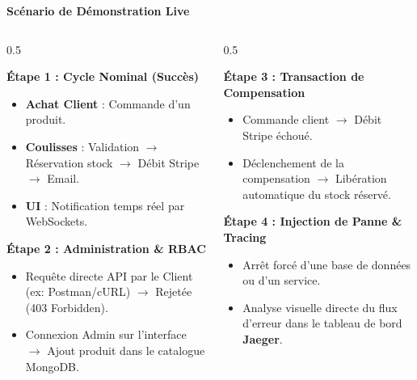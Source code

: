 \documentclass[10pt,aspectratio=169]{beamer}
\begin{document}
\begin{frame}{\textbf{Scénario de Démonstration Live}}
    \begin{columns}
        \begin{column}{0.5\textwidth}
            \begin{block}{\textbf{Étape 1 : Cycle Nominal (Succès)}}
                \begin{itemize}
                    \item \textbf{Achat Client} : Commande d'un produit.
                    \item \textbf{Coulisses} : Validation $\rightarrow$ Réservation stock $\rightarrow$ Débit Stripe $\rightarrow$ Email.
                    \item \textbf{UI} : Notification temps réel par WebSockets.
                \end{itemize}
            \end{block}
            \begin{block}{\textbf{Étape 2 : Administration \& RBAC}}
                \begin{itemize}
                    \item Requête directe API par le Client (ex: Postman/cURL) $\rightarrow$ Rejetée (403 Forbidden).
                    \item Connexion Admin sur l'interface $\rightarrow$ Ajout produit dans le catalogue MongoDB.
                \end{itemize}
            \end{block}
        \end{column}
        \begin{column}{0.5\textwidth}
            \begin{block}{\textbf{Étape 3 : Transaction de Compensation}}
                \begin{itemize}
                    \item Commande client $\rightarrow$ Débit Stripe échoué.
                    \item Déclenchement de la compensation $\rightarrow$ Libération automatique du stock réservé.
                \end{itemize}
            \end{block}
            \begin{block}{\textbf{Étape 4 : Injection de Panne \& Tracing}}
                \begin{itemize}
                    \item Arrêt forcé d'une base de données ou d'un service.
                    \item Analyse visuelle directe du flux d'erreur dans le tableau de bord \textbf{Jaeger}.
                \end{itemize}
            \end{block}
        \end{column}
    \end{columns}
\end{frame}
\end{document}
